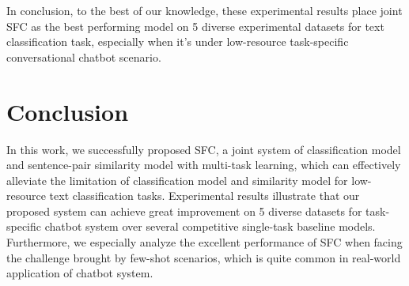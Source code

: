 \documentclass[letterpaper]{article} %
\begin{document}
  In  conclusion, to the best of our knowledge, these experimental results place
  joint  SFC as the best performing model on 5 diverse experimental datasets for
  text   classification   task,   especially   when   it's   under  low-resource
  task-specific conversational chatbot scenario.

  \section{Conclusion}
  In  this  work, we successfully proposed SFC, a joint system of classification
  model  and  sentence-pair similarity model with multi-task learning, which can
  effectively  alleviate  the  limitation of classification model and similarity
  model   for  low-resource  text  classification  tasks.  Experimental  results
  illustrate that our proposed system can achieve great improvement on 5 diverse
  datasets for task-specific chatbot system over several competitive single-task
  baseline  models. Furthermore, we especially analyze the excellent performance
  of SFC when facing the challenge brought by few-shot scenarios, which is quite
  common in real-world application of chatbot system.

  
  
\end{document}
